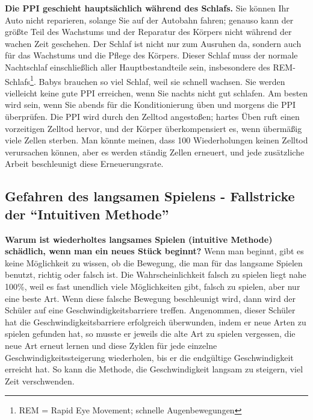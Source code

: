 \textbf{Die PPI geschieht hauptsächlich während des Schlafs.}
Sie können Ihr Auto nicht reparieren, solange Sie auf der Autobahn fahren; genauso kann der größte Teil des Wachstums und der Reparatur des Körpers nicht während der wachen Zeit geschehen.
Der Schlaf ist nicht nur zum Ausruhen da, sondern auch für das Wachstums und die Pflege des Körpers.
Dieser Schlaf muss der normale Nachtschlaf einschließlich aller Hauptbestandteile sein, insbesondere des REM-Schlafs\footnote{REM = Rapid Eye Movement; schnelle Augenbewegungen}.
Babys brauchen so viel Schlaf, weil sie schnell wachsen.
Sie werden vielleicht keine gute PPI erreichen, wenn Sie nachts nicht gut schlafen.
Am besten wird sein, wenn Sie abends für die Konditionierung üben und morgens die PPI überprüfen.
Die PPI wird durch den Zelltod angestoßen; hartes Üben ruft einen vorzeitigen Zelltod hervor, und der Körper überkompensiert es, wenn übermäßig viele Zellen sterben.
Man könnte meinen, dass 100 Wiederholungen keinen Zelltod verursachen können, aber es werden ständig Zellen  erneuert, und jede zusätzliche Arbeit beschleunigt diese Erneuerungsrate.


\subsection{Gefahren des langsamen Spielens - Fallstricke der \enquote{Intuitiven Methode}}
\label{c1ii16}

\textbf{Warum ist wiederholtes langsames Spielen (intuitive Methode) schädlich, wenn man ein neues Stück beginnt?}
Wenn man beginnt, gibt es keine Möglichkeit zu wissen, ob die Bewegung, die man für das langsame Spielen benutzt, richtig oder falsch ist.
Die Wahrscheinlichkeit falsch zu spielen liegt nahe 100\%, weil es fast unendlich viele Möglichkeiten gibt, falsch zu spielen, aber nur eine beste Art.
Wenn diese falsche Bewegung beschleunigt wird, dann wird der Schüler auf eine Geschwindigkeitsbarriere treffen.
Angenommen, dieser Schüler hat die Geschwindigkeitsbarriere erfolgreich überwunden, indem er neue Arten zu spielen gefunden hat, so musste er jeweils die alte Art zu spielen vergessen, die neue Art erneut lernen und diese Zyklen für jede einzelne Geschwindigkeitssteigerung wiederholen, bis er die endgültige Geschwindigkeit erreicht hat.
So kann die Methode, die Geschwindigkeit langsam zu steigern, viel Zeit verschwenden.

